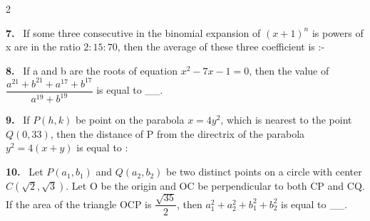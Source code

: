 \documentclass[10pt]{extarticle}
\newcommand{\qn}[1]{\par\smallskip\noindent\textbf{#1.}~}
\begin{document}
\begin{multicols}{2}
\qn{7} If some three consecutive in the binomial expansion of $(x+1)^n$ is powers of x are in the ratio $2:15:70$, then the average of these three coefficient is :-

\qn{8} If a and b are the roots of equation $x^2-7x-1=0$, then the value of $\dfrac{a^{21}+b^{21}+a^{17}+b^{17}}{a^{19}+b^{19}}$ is equal to \_\_.

\qn{9} If $P(h,k)$ be point on the parabola $x=4y^2$, which is nearest to the point $Q(0,33)$, then the distance of P from the directrix of the parabola $y^2=4(x+y)$ is equal to :

\qn{10} Let $P(a_1,b_1)$ and $Q(a_2,b_2)$ be two distinct points on a circle with center $C(\sqrt2,\sqrt3)$. Let O be the origin and OC be perpendicular to both CP and CQ. If the area of the triangle OCP is $\dfrac{\sqrt{35}}{2}$, then $a_1^2+a_2^2+b_1^2+b_2^2$ is equal to \_\_.

\end{multicols}
\end{document}

